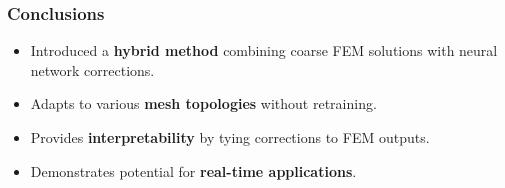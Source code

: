 \documentclass{beamer}
\begin{document}
\begin{frame}
    \frametitle{Conclusions}
    \begin{itemize}
        \item Introduced a \textbf{hybrid method} combining coarse FEM solutions with neural network corrections.
        \item Adapts to various \textbf{mesh topologies} without retraining.
        \item Provides \textbf{interpretability} by tying corrections to FEM outputs.
        \item Demonstrates potential for \textbf{real-time applications}.
    \end{itemize}
\end{frame}
\end{document}
